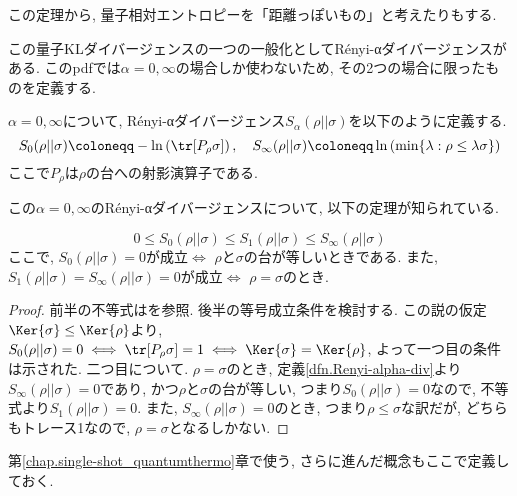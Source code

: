 この定理から, 量子相対エントロピーを「距離っぽいもの」と考えたりもする. 

この量子KLダイバージェンスの一つの一般化としてR\'{e}nyi-αダイバージェンスがある. 
このpdfでは$\alpha=0, \infty$の場合しか使わないため, その2つの場合に限ったものを定義する. 

\begin{mydfn}\label{dfn.Renyi-alpha-div}
  $\alpha=0, \infty$について, R\'{e}nyi-αダイバージェンス$S_{\alpha}(\rho||\sigma)$を以下のように定義する. 
  \begin{equation}
    S_{0}(\rho||\sigma)\coloneqq -\ln\left( \tr[P_{\rho}\sigma] \right), \quad S_{\infty}(\rho||\sigma)\coloneqq \ln\left( \min\{\lambda: \rho\leq \lambda\sigma\} \right)
  \end{equation}
  ここで$P_{\rho}$は$\rho$の台への射影演算子である. 
\end{mydfn}

この$\alpha=0, \infty$のR\'{e}nyi-αダイバージェンスについて, 以下の定理が知られている. 

\begin{mythm}\label{thm.Renyi-alpha-div_alpha-increasing}
  \begin{equation}
    0\leq S_0(\rho||\sigma)\leq S_1(\rho||\sigma)\leq S_\infty(\rho||\sigma)
  \end{equation}
  ここで, $S_0(\rho||\sigma)=0$が成立$\iff$ $\rho$と$\sigma$の台が等しいときである. 
  また, $S_1(\rho||\sigma)=S_\infty(\rho||\sigma)=0$が成立$\iff$ $\rho=\sigma$のとき. 
\end{mythm}

\begin{proof}
  前半の不等式は\cite{SagawaEntropy}を参照. 
  後半の等号成立条件を検討する. 
  この説の仮定$\Ker{\sigma}\leq\Ker{\rho}$より, $S_0(\rho||\sigma)=0\iff \tr[P_{\rho}\sigma]=1\iff \Ker{\sigma}=\Ker{\rho}$, よって一つ目の条件は示された. 
  二つ目について. 
  $\rho=\sigma$のとき, 定義\ref{dfn.Renyi-alpha-div}より$S_{\infty}(\rho||\sigma)=0$であり, かつ$\rho$と$\sigma$の台が等しい, つまり$S_0(\rho||\sigma)=0$なので, 不等式より$S_1(\rho||\sigma)=0$. 
  また, $S_{\infty}(\rho||\sigma)=0$のとき, つまり$\rho\leq\sigma$な訳だが, どちらもトレース1なので, $\rho=\sigma$となるしかない. 
\end{proof}

第\ref{chap.single-shot_quantumthermo}章で使う, さらに進んだ概念もここで定義しておく. 

